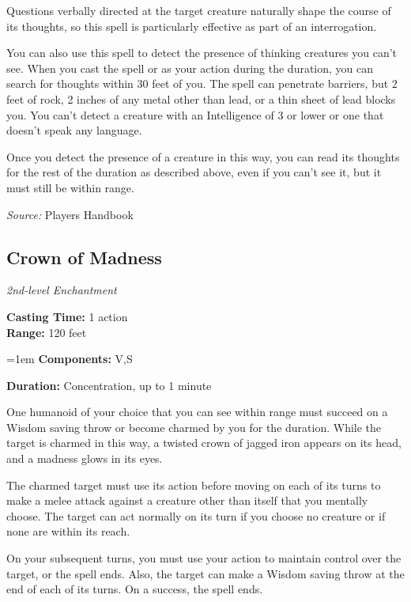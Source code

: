 \documentclass[10pt,twoside,twocolumn]{article}
\begin{document}
Questions verbally directed at the target creature naturally shape the course of its thoughts, so this spell is particularly effective as part of an interrogation.

You can also use this spell to detect the presence of thinking creatures you can't see. When you cast the spell or as your action during the duration, you can search for thoughts within 30 feet of you. The spell can penetrate barriers, but 2 feet of rock, 2 inches of any metal other than lead, or a thin sheet of lead blocks you. You can't detect a creature with an Intelligence of 3 or lower or one that doesn't speak any language.

Once you detect the presence of a creature in this way, you can read its thoughts for the rest of the duration as described above, even if you can't see it, but it must still be within range.



\textit{Source:} Players Handbook

\subsection{Crown of Madness}
\textit{2nd-level Enchantment}
\smallskip

\noindent
\textbf{Casting Time:}  1 action\\
\textbf{Range:}  120 feet

\noindent
\hangindent=1em
\textbf{Components:}  V,S

\noindent
\textbf{Duration:}  Concentration, up to 1 minute\\
\smallskip



One humanoid of your choice that you can see within range must succeed on a Wisdom saving throw or become charmed by you for the duration. While the target is charmed in this way, a twisted crown of jagged iron appears on its head, and a madness glows in its eyes.

The charmed target must use its action before moving on each of its turns to make a melee attack against a creature other than itself that you mentally choose. The target can act normally on its turn if you choose no creature or if none are within its reach.

On your subsequent turns, you must use your action to maintain control over the target, or the spell ends. Also, the target can make a Wisdom saving throw at the end of each of its turns. On a success, the spell ends.
\end{document}
